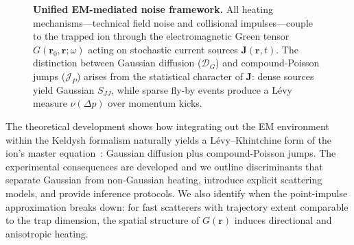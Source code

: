 \begin{figure}[t]
  \centering
  
  \caption{\textbf{Unified EM-mediated noise framework.}
  All heating mechanisms—technical field noise and collisional impulses—couple to the trapped ion through the electromagnetic Green tensor $G(\mathbf{r}_0,\mathbf{r};\omega)$ acting on stochastic current sources $\mathbf{J}(\mathbf{r},t)$.
  The distinction between Gaussian diffusion ($\mathcal{D}_G$) and compound-Poisson jumps ($\mathcal{J}_P$) arises from the statistical character of $\mathbf{J}$: dense sources yield Gaussian $S_{JJ}$, while sparse fly-by events produce a Lévy measure $\nu(\Delta p)$ over momentum kicks.}
  \label{fig:em_mediation}
\end{figure}

The theoretical development shows how integrating out the EM environment within the Keldysh formalism naturally yields a Lévy–Khintchine form of the ion's master equation~\cite{Sornette2006}: Gaussian diffusion plus compound-Poisson jumps.
The experimental consequences are developed and we outline discriminants that separate Gaussian from non-Gaussian heating, introduce explicit scattering models, and provide inference protocols.
We also identify when the point-impulse approximation breaks down: for fast scatterers with trajectory extent comparable to the trap dimension, the spatial structure of $G(\mathbf{r})$ induces directional and anisotropic heating.
